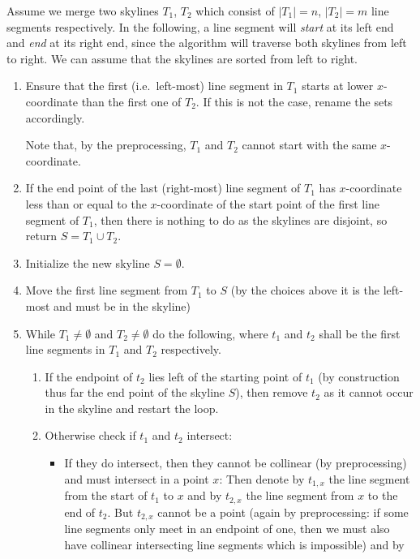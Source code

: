 \documentclass[english, fontsize=12pt, paper=a4, twoside=false, draft=true, pagesize=auto, version=last, DIV=16]{scrartcl}
\theoremstyle{break}
\begin{document}
Assume we merge two skylines $T_1$, $T_2$ which consist of $|T_1|=n$, $|T_2|=m$ line
segments respectively. In the following, a line segment will \textit{start} at its left end
and \textit{end} at its right end, since the algorithm will traverse both skylines from left
to right. We can assume that the skylines are sorted from left to right.

\begin{enumerate}
  \item Ensure that the first (i.e.\ left-most) line segment in $T_1$ starts at lower
    $x$-coordinate than the first one of $T_2$. If this is not the case, rename the sets
    accordingly.

    Note that, by the preprocessing, $T_1$ and $T_2$ cannot start with the same
    $x$-coordinate.
  \item If the end point of the last (right-most) line segment of $T_1$ has $x$-coordinate
    less than or equal to the $x$-coordinate of the start point of the first line segment
    of $T_1$, then there is nothing to do as the skylines are disjoint, so return
    $S=T_1\cup T_2$.
  \item Initialize the new skyline $S = \emptyset$.
  \item Move the first line segment from $T_1$ to $S$ (by the choices above it is the
    left-most and must be in the skyline)
  \item While $T_1 \neq \emptyset$ and $T_2\neq\emptyset$ do the following, where $t_1$
    and $t_2$ shall be the first line segments in $T_1$ and $T_2$ respectively.
    \begin{enumerate}
      \item If the endpoint of $t_2$ lies left of the starting point of $t_1$ (by
        construction thus far the end point of the skyline $S$), then remove $t_2$ as it
        cannot occur in the skyline and restart the loop.
      \item Otherwise check if $t_1$ and $t_2$ intersect:
        \begin{itemize}
          \item If they do intersect, then they cannot be collinear (by preprocessing) and
            must intersect in a point $x$: Then denote by $t_{1,x}$ the line segment from
            the start of $t_1$ to $x$ and by $t_{2,x}$ the line segment from $x$ to the
            end of $t_2$. But $t_{2,x}$ cannot be a point (again by preprocessing: if some
            line segments only meet in an endpoint of one, then we must also have
            collinear intersecting line segments which is impossible) and by

\end{itemize}
\end{enumerate}
\end{enumerate}
\end{document}
